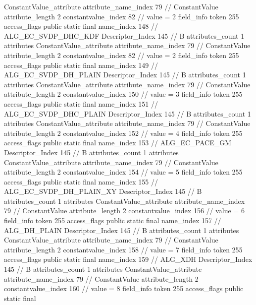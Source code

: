 {{{{{{				ConstantValue_attribute {
					attribute_name_index	79		// ConstantValue
					attribute_length	2
					constantvalue_index	82		// value = 2
				}
				}
			}
			field_info {
				token	255
				access_flags	public static final
				name_index	148		// ALG_EC_SVDP_DHC_KDF
				Descriptor_Index	145		// B
				attributes_count	1
				attributes {
				ConstantValue_attribute {
					attribute_name_index	79		// ConstantValue
					attribute_length	2
					constantvalue_index	82		// value = 2
				}
				}
			}
			field_info {
				token	255
				access_flags	public static final
				name_index	149		// ALG_EC_SVDP_DH_PLAIN
				Descriptor_Index	145		// B
				attributes_count	1
				attributes {
				ConstantValue_attribute {
					attribute_name_index	79		// ConstantValue
					attribute_length	2
					constantvalue_index	150		// value = 3
				}
				}
			}
			field_info {
				token	255
				access_flags	public static final
				name_index	151		// ALG_EC_SVDP_DHC_PLAIN
				Descriptor_Index	145		// B
				attributes_count	1
				attributes {
				ConstantValue_attribute {
					attribute_name_index	79		// ConstantValue
					attribute_length	2
					constantvalue_index	152		// value = 4
				}
				}
			}
			field_info {
				token	255
				access_flags	public static final
				name_index	153		// ALG_EC_PACE_GM
				Descriptor_Index	145		// B
				attributes_count	1
				attributes {
				ConstantValue_attribute {
					attribute_name_index	79		// ConstantValue
					attribute_length	2
					constantvalue_index	154		// value = 5
				}
				}
			}
			field_info {
				token	255
				access_flags	public static final
				name_index	155		// ALG_EC_SVDP_DH_PLAIN_XY
				Descriptor_Index	145		// B
				attributes_count	1
				attributes {
				ConstantValue_attribute {
					attribute_name_index	79		// ConstantValue
					attribute_length	2
					constantvalue_index	156		// value = 6
				}
				}
			}
			field_info {
				token	255
				access_flags	public static final
				name_index	157		// ALG_DH_PLAIN
				Descriptor_Index	145		// B
				attributes_count	1
				attributes {
				ConstantValue_attribute {
					attribute_name_index	79		// ConstantValue
					attribute_length	2
					constantvalue_index	158		// value = 7
				}
				}
			}
			field_info {
				token	255
				access_flags	public static final
				name_index	159		// ALG_XDH
				Descriptor_Index	145		// B
				attributes_count	1
				attributes {
				ConstantValue_attribute {
					attribute_name_index	79		// ConstantValue
					attribute_length	2
					constantvalue_index	160		// value = 8
				}
				}
			}
			field_info {
				token	255
				access_flags	public static final
}}}}}
